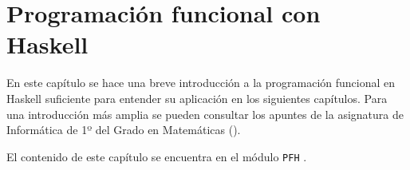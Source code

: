 \chapter{Programación funcional con Haskell}

En este capítulo se hace una breve introducción a la programación funcional en
Haskell suficiente para entender su aplicación en los siguientes
capítulos. Para una introducción más amplia se pueden consultar los apuntes de
la asignatura de Informática de 1º del Grado en Matemáticas
(\cite{Alonso-15b}). 

El contenido de este capítulo se encuentra en el módulo \texttt{PFH} 
.

